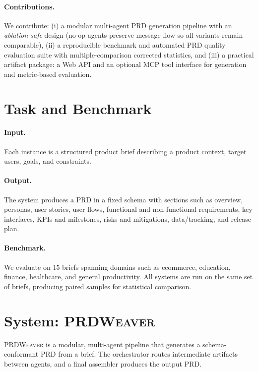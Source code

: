 \documentclass[11pt]{article}
\begin{document}
\paragraph{Contributions.}
We contribute:
(i) a modular multi-agent PRD generation pipeline with an \emph{ablation-safe} design (no-op agents preserve message flow so all variants remain comparable),
(ii) a reproducible benchmark and automated PRD quality evaluation suite with multiple-comparison corrected statistics,
and (iii) a practical artifact package: a Web API and an optional MCP tool interface for generation and metric-based evaluation.

\section{Task and Benchmark}
\label{sec:task}

\paragraph{Input.}
Each instance is a structured product brief describing a product context, target users, goals, and constraints.

\paragraph{Output.}
The system produces a PRD in a fixed schema with sections such as overview, personas, user stories, user flows, functional and non-functional requirements, key interfaces, KPIs and milestones, risks and mitigations, data/tracking, and release plan.

\paragraph{Benchmark.}
We evaluate on 15 briefs spanning domains such as ecommerce, education, finance, healthcare, and general productivity.
All systems are run on the same set of briefs, producing paired samples for statistical comparison.

\section{System: \textsc{PRDWeaver}}
\label{sec:system}

\textsc{PRDWeaver} is a modular, multi-agent pipeline that generates a schema-conformant PRD from a brief.
The orchestrator routes intermediate artifacts between agents, and a final assembler produces the output PRD.
\end{document}

